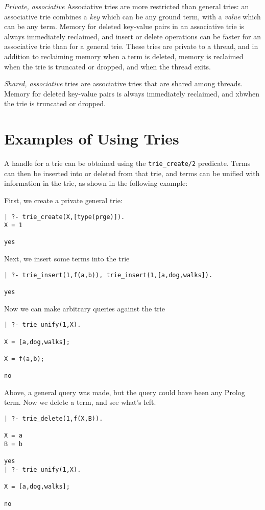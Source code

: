 \item {\em Private, associative} Associative tries are more restricted
  than general tries: an associative trie combines a {\em key} which
  can be any ground term, with a {\em value} which can be any term.
  Memory for deleted key-value pairs in an associative trie is always
  immediately reclaimed, and insert or delete operations can be faster
  for an associative trie than for a general trie.  These tries are
  private to a thread, and in addition to reclaiming memory when a
  term is deleted, memory is reclaimed when the trie is truncated or
  dropped, and when the thread exits.

\item {\em Shared, associative} tries are associative tries that are
  shared among threads.  Memory for deleted key-value pairs is always
  immediately reclaimed, and xbwhen the trie is truncated or dropped.
\ei

\section{Examples of Using Tries}

A handle for a trie can be obtained using the {\tt trie\_create/2}
predicate.  Terms can then be inserted into or deleted from that trie,
and terms can be unified with information in the trie, as shown in the
following example:

\begin{example} \rm
First, we create a private general trie: 
{\small
\begin{verbatim}
| ?- trie_create(X,[type(prge)]).
X = 1

yes
\end{verbatim}
}
%
Next, we insert some terms into the trie
{\small
\begin{verbatim}
| ?- trie_insert(1,f(a,b)), trie_insert(1,[a,dog,walks]).

yes
\end{verbatim}
}
Now we can make arbitrary queries against the trie
{\small
\begin{verbatim}
| ?- trie_unify(1,X).

X = [a,dog,walks];

X = f(a,b);

no
\end{verbatim}
}
\noindent
Above, a general query was made, but the query could have been any
Prolog term.  Now we delete a term, and see what's left.
{\small
\begin{verbatim}
| ?- trie_delete(1,f(X,B)).

X = a
B = b

yes
| ?- trie_unify(1,X).

X = [a,dog,walks];

no
\end{verbatim}
}
\end{example}

